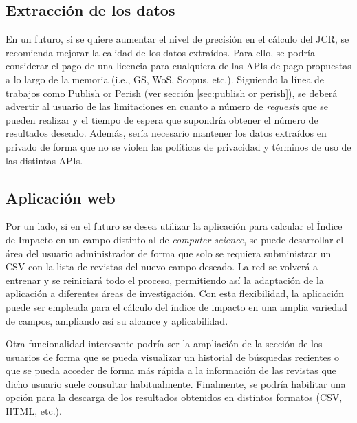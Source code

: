 \subsection{Extracción de los datos}
En un futuro, si se quiere aumentar el nivel de precisión en el cálculo del JCR, se recomienda mejorar la calidad de los datos extraídos. Para ello, se podría considerar el pago de una licencia para cualquiera de las APIs de pago propuestas a lo largo de la memoria (i.e.,  GS, WoS, Scopus, etc.). Siguiendo la línea de trabajos como Publish or Perish (ver sección \ref{sec:publish or perish}), se deberá advertir al usuario de las limitaciones en cuanto a número de \textit{requests} que se pueden realizar y el tiempo de espera que supondría obtener el número de resultados deseado. Además, sería necesario mantener los datos extraídos en privado de forma que no se violen las políticas de privacidad y términos de uso de las distintas APIs. 

\subsection{Aplicación web}

Por un lado, si en el futuro se desea utilizar la aplicación para calcular el Índice de Impacto en un campo distinto al de \textit{computer science}, se puede desarrollar el área del usuario administrador de forma que solo se requiera subministrar un CSV con la lista de revistas del nuevo campo deseado. La red se volverá a entrenar y se reiniciará todo el proceso, permitiendo así la adaptación de la aplicación a diferentes áreas de investigación. Con esta flexibilidad, la aplicación puede ser empleada para el cálculo del índice de impacto en una amplia variedad de campos, ampliando así su alcance y aplicabilidad.

Otra funcionalidad interesante podría ser la ampliación de la sección de los usuarios de forma que se pueda visualizar un historial de búsquedas recientes o que se pueda acceder de forma más rápida a la información de las revistas que dicho usuario suele consultar habitualmente. Finalmente, se podría habilitar una opción para la descarga de los resultados obtenidos en distintos formatos (CSV, HTML, etc.).



